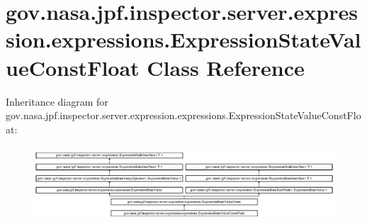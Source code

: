 \hypertarget{classgov_1_1nasa_1_1jpf_1_1inspector_1_1server_1_1expression_1_1expressions_1_1_expression_state_value_const_float}{}\section{gov.\+nasa.\+jpf.\+inspector.\+server.\+expression.\+expressions.\+Expression\+State\+Value\+Const\+Float Class Reference}
\label{classgov_1_1nasa_1_1jpf_1_1inspector_1_1server_1_1expression_1_1expressions_1_1_expression_state_value_const_float}
Inheritance diagram for gov.\+nasa.\+jpf.\+inspector.\+server.\+expression.\+expressions.\+Expression\+State\+Value\+Const\+Float\+:\begin{figure}[H]
\begin{center}
\leavevmode
\includegraphics[height=2.847458cm]{classgov_1_1nasa_1_1jpf_1_1inspector_1_1server_1_1expression_1_1expressions_1_1_expression_state_value_const_float}
\end{center}
\end{figure}
